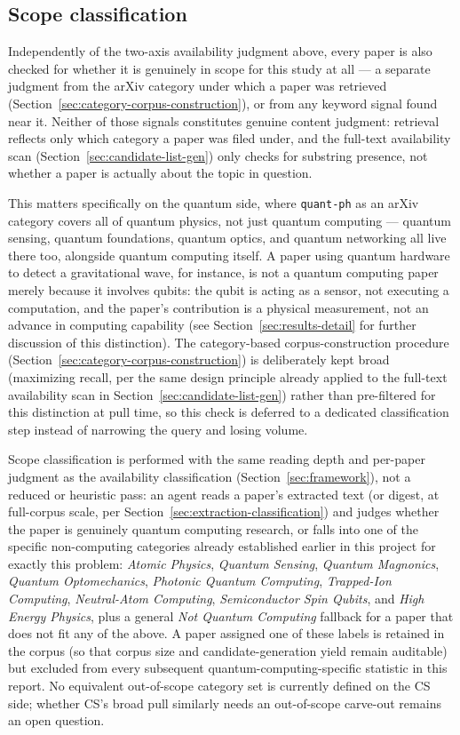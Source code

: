 \subsection{Scope classification}
\label{sec:domain-classification}

Independently of the two-axis availability judgment above, every paper is also
checked for whether it is genuinely in scope for this study at all --- a separate
judgment from the arXiv category under which a paper was retrieved
(Section~\ref{sec:category-corpus-construction}), or from any keyword signal found
near it. Neither of those signals constitutes genuine content judgment: retrieval
reflects only which category a paper was filed under, and the full-text availability
scan (Section~\ref{sec:candidate-list-gen}) only checks for substring presence, not
whether a paper is actually about the topic in question.

This matters specifically on the quantum side, where \texttt{quant-ph} as an arXiv
category covers all of quantum physics, not just quantum computing ---
quantum sensing, quantum foundations, quantum optics, and quantum networking all live
there too, alongside quantum computing itself. A paper using quantum hardware to
detect a gravitational wave, for instance, is not a quantum computing paper merely
because it involves qubits: the qubit is acting as a sensor, not executing a
computation, and the paper's contribution is a physical measurement, not an advance in
computing capability (see Section~\ref{sec:results-detail} for further discussion of
this distinction). The category-based corpus-construction procedure
(Section~\ref{sec:category-corpus-construction}) is deliberately kept broad
(maximizing recall, per the same design principle already applied to the full-text
availability scan in Section~\ref{sec:candidate-list-gen}) rather than pre-filtered
for this distinction at pull time, so this check is deferred to a dedicated
classification step instead of narrowing the query and losing volume.

Scope classification is performed with the same reading depth and per-paper judgment
as the availability classification (Section~\ref{sec:framework}), not a reduced or
heuristic pass: an agent reads a paper's extracted text (or digest, at full-corpus
scale, per Section~\ref{sec:extraction-classification}) and judges whether the paper
is genuinely quantum computing research, or falls into one of the specific
non-computing categories already established earlier in this project for exactly this
problem: \emph{Atomic Physics}, \emph{Quantum Sensing}, \emph{Quantum Magnonics},
\emph{Quantum Optomechanics}, \emph{Photonic Quantum Computing}, \emph{Trapped-Ion
Computing}, \emph{Neutral-Atom Computing}, \emph{Semiconductor Spin Qubits}, and
\emph{High Energy Physics}, plus a general \emph{Not Quantum Computing} fallback for a
paper that does not fit any of the above. A paper assigned one of these labels is
retained in the corpus (so that corpus size and candidate-generation yield remain
auditable) but excluded from every subsequent quantum-computing-specific statistic in
this report. No equivalent out-of-scope category set is currently defined on the CS
side; whether CS's broad pull similarly needs an out-of-scope carve-out remains an
open question.

